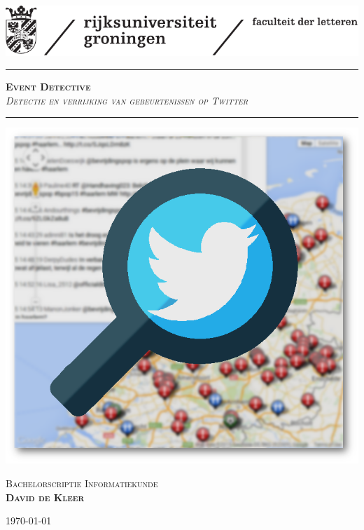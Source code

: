 
\begin{titlepage}
\begin{center}
\setcounter{page}{0}


\vspace*{-2cm}
\includegraphics[scale=1]{logo.pdf}

\vspace{2 cm}

\hrule
\vspace{1 cm}
\Huge{\textbf{\textsc{Event Detective}}}\\
\vspace{0.5 cm}
\Large{\textit{\textsc{Detectie en verrijking van gebeurtenissen op Twitter}}}

\vspace{1 cm}
\hrule
\vspace{1.5 cm}

\includegraphics[scale=0.45]{mapchartlogo.png}
\vfill


\LARGE{\textsc{Bachelorscriptie Informatiekunde}}\\
\vspace{1.3 cm}
\Large{\textsc{\textbf{David de Kleer}}}
\vspace{0.5 cm}

\vrule
\hspace{0.2 cm}
\normalsize{\textsc{\today}}
\hspace{0.2 cm}
\vrule
\end{center}
\end{titlepage}
